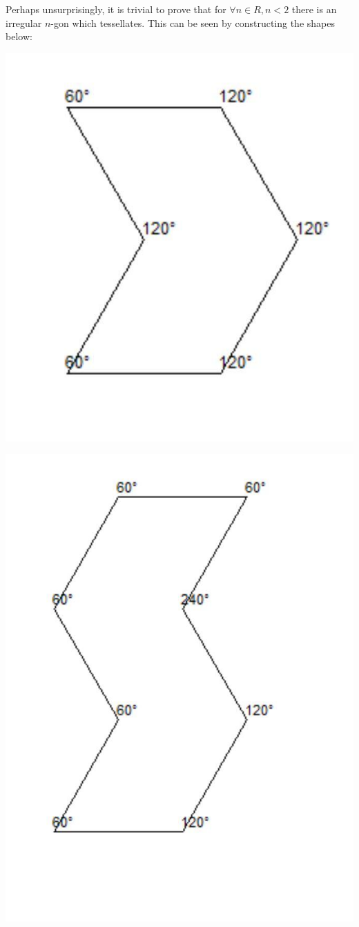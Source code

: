 \documentclass[1opt,a4paper]{article}
\begin{document}
\begin{multicols}{2}
Perhaps unsurprisingly, it is trivial to prove that for \(∀ n∈R, n<2\)
there is an irregular \(n\)-gon which tessellates. This can be seen by
constructing the shapes below:

\includegraphics[width=\linewidth]{image_3.jpg}

\includegraphics[width=\linewidth]{image_4.jpg}


\end{multicols}
\end{document}
